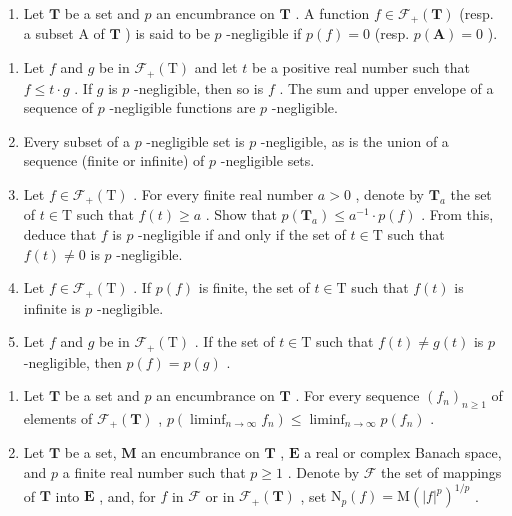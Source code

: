 \begin{enumerate}
\def\labelenumi{\arabic{enumi})}
\setcounter{enumi}{1}
\tightlist
\item
  Let \(\mathbf{T}\) be a set and \(p\) an encumbrance on \(\mathbf{T}\) . A function \(f \in \mathcal{F}_{+}(\mathbf{T})\) (resp. a subset A of \(\mathbf{T}\) ) is said to be \(p\) -negligible if \(p(f) = 0\) (resp. \(p(\mathbf{A}) = 0\) ).
\end{enumerate}

\begin{enumerate}
\def\labelenumi{\alph{enumi})}
\item
  Let \(f\) and \(g\) be in \(\mathcal{F}_{+}(\mathrm{T})\) and let \(t\) be a positive real number such that \(f \leqslant t \cdot g\) . If \(g\) is \(p\) -negligible, then so is \(f\) . The sum and upper envelope of a sequence of \(p\) -negligible functions are \(p\) -negligible.
\item
  Every subset of a \(p\) -negligible set is \(p\) -negligible, as is the union of a sequence (finite or infinite) of \(p\) -negligible sets.
\item
  Let \(f \in \mathcal{F}_+(\mathrm{T})\) . For every finite real number \(a > 0\) , denote by \(\mathbf{T}_a\) the set of \(t \in \mathrm{T}\) such that \(f(t) \geqslant a\) . Show that \(p(\mathbf{T}_a) \leqslant a^{-1} \cdot p(f)\) . From this, deduce that \(f\) is \(p\) -negligible if and only if the set of \(t \in \mathrm{T}\) such that \(f(t) \neq 0\) is \(p\) -negligible.
\item
  Let \(f \in \mathcal{F}_{+}(\mathrm{T})\) . If \(p(f)\) is finite, the set of \(t \in \mathrm{T}\) such that \(f(t)\) is infinite is \(p\) -negligible.
\item
  Let \(f\) and \(g\) be in \(\mathcal{F}_{+}(\mathrm{T})\) . If the set of \(t \in \mathrm{T}\) such that \(f(t) \neq g(t)\) is \(p\) -negligible, then \(p(f) = p(g)\) .
\end{enumerate}

\begin{enumerate}
\def\labelenumi{\arabic{enumi})}
\setcounter{enumi}{2}
\item
  Let \(\mathbf{T}\) be a set and \(p\) an encumbrance on \(\mathbf{T}\) . For every sequence \((f_n)_{n\geqslant 1}\) of elements of \(\mathcal{F}_{+}(\mathbf{T})\) , \(p(\liminf_{n\to \infty}f_n)\leqslant \liminf_{n\to \infty}p(f_n)\) .
\item
  Let \(\mathbf{T}\) be a set, \(\mathbf{M}\) an encumbrance on \(\mathbf{T}\) , \(\mathbf{E}\) a real or complex Banach space, and \(p\) a finite real number such that \(p \geqslant 1\) . Denote by \(\mathcal{F}\) the set of mappings of \(\mathbf{T}\) into \(\mathbf{E}\) , and, for \(f\) in \(\mathcal{F}\) or in \(\mathcal{F}_{+}(\mathbf{T})\) , set \(\mathrm{N}_p(f) = \mathrm{M}(|f|^p)^{1/p}\) .
\end{enumerate}

